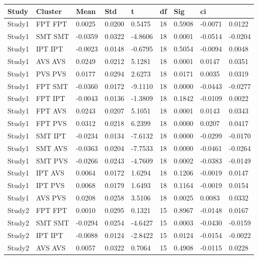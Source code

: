 \begin{table}[!hbt]
\centering
\begin{tabular}[0.2em]{@{}lllllllll@{}}\toprule
Study & Cluster & Mean & Std & t & df & Sig & ci\\\toprule[0.2em]
Study1 & FPT FPT & 0.0025 & 0.0200 & 0.5475 & 18 & 0.5908 & -0.0071 & 0.0122 \\\midrule
Study1 & SMT SMT & -0.0359 & 0.0322 & -4.8606 & 18 & 0.0001 & -0.0514 & -0.0204 \\\midrule
Study1 & IPT IPT & -0.0023 & 0.0148 & -0.6795 & 18 & 0.5054 & -0.0094 & 0.0048 \\\midrule
Study1 & AVS AVS & 0.0249 & 0.0212 & 5.1281 & 18 & 0.0001 & 0.0147 & 0.0351 \\\midrule
Study1 & PVS PVS & 0.0177 & 0.0294 & 2.6273 & 18 & 0.0171 & 0.0035 & 0.0319 \\\midrule
Study1 & FPT SMT & -0.0360 & 0.0172 & -9.1110 & 18 & 0.0000 & -0.0443 & -0.0277 \\\midrule
Study1 & FPT IPT & -0.0043 & 0.0136 & -1.3809 & 18 & 0.1842 & -0.0109 & 0.0022 \\\midrule
Study1 & FPT AVS & 0.0243 & 0.0207 & 5.1051 & 18 & 0.0001 & 0.0143 & 0.0343 \\\midrule
Study1 & FPT PVS & 0.0312 & 0.0218 & 6.2399 & 18 & 0.0000 & 0.0207 & 0.0417 \\\midrule
Study1 & SMT IPT & -0.0234 & 0.0134 & -7.6132 & 18 & 0.0000 & -0.0299 & -0.0170 \\\midrule
Study1 & SMT AVS & -0.0363 & 0.0204 & -7.7533 & 18 & 0.0000 & -0.0461 & -0.0264 \\\midrule
Study1 & SMT PVS & -0.0266 & 0.0243 & -4.7609 & 18 & 0.0002 & -0.0383 & -0.0149 \\\midrule
Study1 & IPT AVS & 0.0064 & 0.0172 & 1.6294 & 18 & 0.1206 & -0.0019 & 0.0147 \\\midrule
Study1 & IPT PVS & 0.0068 & 0.0179 & 1.6493 & 18 & 0.1164 & -0.0019 & 0.0154 \\\midrule
Study1 & AVS PVS & 0.0208 & 0.0258 & 3.5106 & 18 & 0.0025 & 0.0083 & 0.0332 \\\midrule
Study2 & FPT FPT & 0.0010 & 0.0295 & 0.1321 & 15 & 0.8967 & -0.0148 & 0.0167 \\\midrule
Study2 & SMT SMT & -0.0294 & 0.0254 & -4.6427 & 15 & 0.0003 & -0.0430 & -0.0159 \\\midrule
Study2 & IPT IPT & -0.0088 & 0.0124 & -2.8422 & 15 & 0.0124 & -0.0154 & -0.0022 \\\midrule
Study2 & AVS AVS & 0.0057 & 0.0322 & 0.7064 & 15 & 0.4908 & -0.0115 & 0.0228 \\\midrule

\end{tabular}
\end{table}

